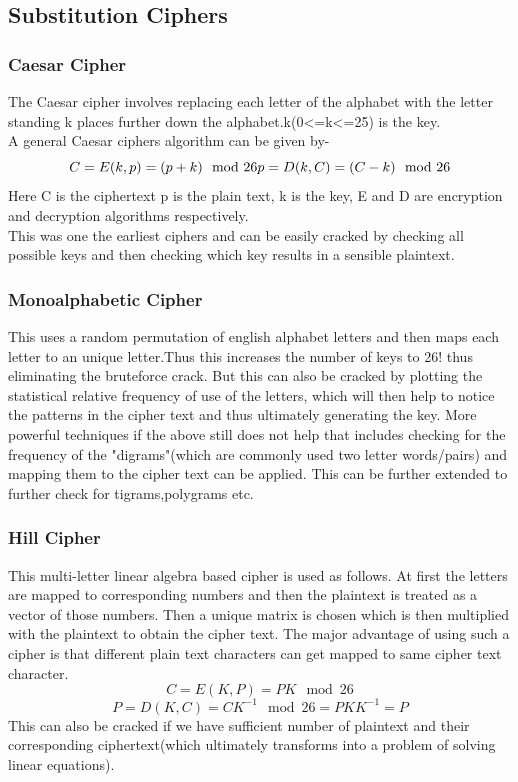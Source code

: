 \documentclass{article}
\begin{document}
\subsection{Substitution Ciphers}
\subsubsection{Caesar Cipher}
    The Caesar cipher involves replacing each letter of the alphabet with the letter standing k places further down the alphabet.k(0<=k<=25) is the key.\\
A general Caesar ciphers algorithm can be given by-\\
\[C = E(k,p) = (p + k)\mod 26\\
p = D(k,C) = (C - k)\mod 26\\
\]
Here C is the ciphertext p is the plain text, k is the key, E and D are encryption and decryption algorithms respectively.\\
This was one the earliest ciphers and can be easily cracked by checking all possible keys and then checking which key results in a sensible plaintext.
\subsubsection{Monoalphabetic Cipher}
This uses a random permutation of english alphabet letters and then maps each letter to an unique letter.Thus this increases the number of keys to 26! thus eliminating the bruteforce crack.
But this can also be cracked by plotting the statistical relative frequency of use of the letters, which will then help to notice the patterns in the cipher text and thus ultimately generating the key.
More powerful techniques if the above still does not help that includes checking for the frequency of the "digrams"(which are commonly used two letter words/pairs) and mapping them to the cipher text can be applied.
This can be further extended to further check for tigrams,polygrams etc.

\subsubsection{Hill Cipher}
This multi-letter linear algebra based cipher is used as follows. At first the letters are mapped to corresponding numbers and then the plaintext is treated as a vector of those numbers. Then a unique matrix is chosen which is then multiplied with the plaintext to obtain the cipher text. The major advantage of using such a cipher is that different plain text characters can get mapped to same cipher text character.
\[
C = E(K,P) = PK\mod 26
\]
\[
P = D(K,C) = CK^{-1}\mod 26 = PKK^{-1} = P
\]
This can also be cracked if we have sufficient number of plaintext and their corresponding ciphertext(which ultimately transforms into a problem of solving linear equations).
\end{document}
